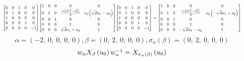 \documentclass[11pt]{article}
\theoremstyle{definition}
\begin{document}
\[
\scaletoalign{\textwidth}{{\left[\begin{matrix}0 & 0 & 1 & 0 & 0\\0 & 1 & 0 & 0 & 0\\1 & 0 & 0 & 0 & 0\\0 & 0 & 0 & 1 & 0\\0 & 0 & 0 & 0 & -1\end{matrix}\right]} {\left[\begin{matrix}1 & 0 & 0 & 0 & 0\\0 & 1 & 0 & \frac{c_{0} \left(d u_{1}^{2} - u_{0}^{2}\right)}{2} & c_{0} \left(\sqrt{d} u_{1} - u_{0}\right)\\0 & 0 & 1 & 0 & 0\\0 & 0 & 0 & 1 & 0\\0 & 0 & 0 & \sqrt{d} u_{1} + u_{0} & 1\end{matrix}\right]} {\left[\begin{matrix}0 & 0 & 1 & 0 & 0\\0 & 1 & 0 & 0 & 0\\1 & 0 & 0 & 0 & 0\\0 & 0 & 0 & 1 & 0\\0 & 0 & 0 & 0 & -1\end{matrix}\right]} = {\left[\begin{matrix}1 & 0 & 0 & 0 & 0\\0 & 1 & 0 & \frac{c_{0} \left(d u_{1}^{2} - u_{0}^{2}\right)}{2} & c_{0} \left(- \sqrt{d} u_{1} + u_{0}\right)\\0 & 0 & 1 & 0 & 0\\0 & 0 & 0 & 1 & 0\\0 & 0 & 0 & - \sqrt{d} u_{1} - u_{0} & 1\end{matrix}\right]}}
\]
\[
\alpha = \left( -2, \  0, \  0, \  0, \  0\right), \beta = \left( 0, \  2, \  0, \  0, \  0\right), \sigma_{\alpha}(\beta) = \left( 0, \  2, \  0, \  0, \  0\right)
\]
\[
\scaletoalign{\textwidth}{w_{\alpha} X_{\beta}\left(u_{0}\right) w_{\alpha}^{-1} = X_{\sigma_{\alpha}\left(\beta\right)}\left(u_{0}\right)}
\]
\end{document}
